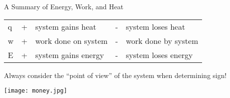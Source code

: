 \documentclass[notes=only]{beamer}
\begin{document}
\begin{frame}{A Summary of Energy, Work, and Heat}
	\begin{center}
		\begin{tabular} {L L l L l}
			\toprule
			q & + & system gains heat & - & system loses heat \\
			w & + & work done on system & - & work done by system \\
			\Delta E & + & system gains energy & - & system loses
			energy \\ \bottomrule
		\end{tabular}
	\end{center}

	Always consider the ``point of view'' of the system when determining
	sign!

	\pause

	\begin{center}
		\texttt{[image: money.jpg]}
	\end{center}
\end{frame}

%
%
%
%
\end{document}
